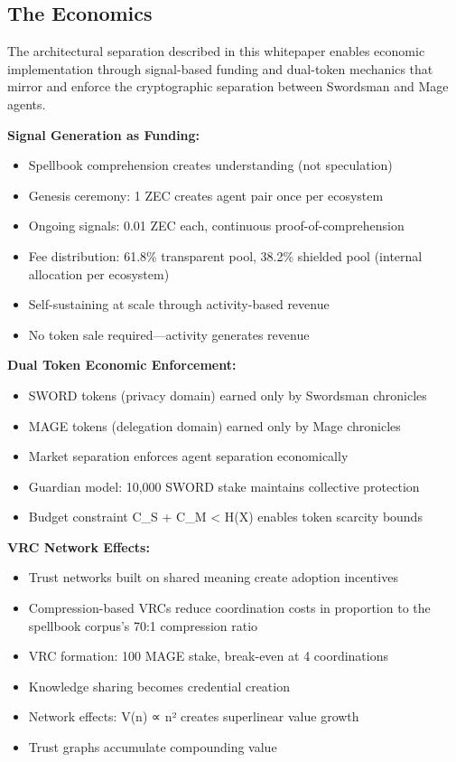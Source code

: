 \documentclass[
  11pt,
]{article}
\begin{document}
\subsection{The Economics}\label{the-economics}

The architectural separation described in this whitepaper enables
economic implementation through signal-based funding and dual-token
mechanics that mirror and enforce the cryptographic separation between
Swordsman and Mage agents.

\textbf{Signal Generation as Funding:}

\begin{itemize}
\item
  Spellbook comprehension creates understanding (not speculation)
\item
  Genesis ceremony: 1 ZEC creates agent pair once per ecosystem
\item
  Ongoing signals: 0.01 ZEC each, continuous proof-of-comprehension
\item
  Fee distribution: 61.8\% transparent pool, 38.2\% shielded pool
  (internal allocation per ecosystem)
\item
  Self-sustaining at scale through activity-based revenue
\item
  No token sale required---activity generates revenue
\end{itemize}

\textbf{Dual Token Economic Enforcement:}

\begin{itemize}
\item
  SWORD tokens (privacy domain) earned only by Swordsman chronicles
\item
  MAGE tokens (delegation domain) earned only by Mage chronicles
\item
  Market separation enforces agent separation economically
\item
  Guardian model: 10,000 SWORD stake maintains collective protection
\item
  Budget constraint C\_S + C\_M \textless{} H(X) enables token scarcity
  bounds
\end{itemize}

\textbf{VRC Network Effects:}

\begin{itemize}
\item
  Trust networks built on shared meaning create adoption incentives
\item
  Compression-based VRCs reduce coordination costs in proportion to the
  spellbook corpus's 70:1 compression ratio
\item
  VRC formation: 100 MAGE stake, break-even at 4 coordinations
\item
  Knowledge sharing becomes credential creation
\item
  Network effects: V(n) ∝ n² creates superlinear value growth
\item
  Trust graphs accumulate compounding value
\end{itemize}
\end{document}
